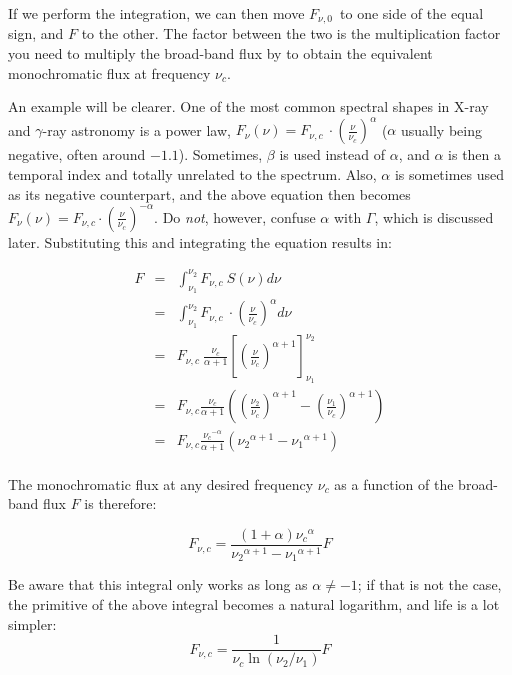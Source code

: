 \documentclass[12pt,a4paper]{article}
\newcommand{\fv}{\ensuremath{F_{\nu}}}
\newcommand{\fvz}{\ensuremath{F_{\nu, 0}}}
\newcommand{\fvc}{\ensuremath{F_{\nu, c}}}
\begin{document}
If we perform the integration, we can then move \fvz\ to one side of the equal sign, and $F$ to the other. The factor between the two is the multiplication factor you need to multiply the broad-band flux by to obtain the equivalent monochromatic flux at frequency $\nu_c$. 

An example will be clearer. One of the most common spectral shapes in X-ray and $\gamma$-ray astronomy is a power law, $\fv (\nu) = \fvc\ \cdot ({\frac{\nu}{\nu_c}})^{\alpha}$ ($\alpha$ usually being negative, often around $-1.1$). Sometimes, $\beta$ is used instead of $\alpha$, and $\alpha$ is then a temporal index and totally unrelated to the spectrum. Also, $\alpha$ is sometimes used as its negative counterpart, and the above equation then becomes $\fv (\nu) = \fvc \cdot {(\frac{\nu}{\nu_c})}^{-\alpha}$. Do \emph{not}, however, confuse $\alpha$ with $\Gamma$, which is discussed later. Substituting this and integrating the equation results in:

\begin{eqnarray*}
F & = & \int_{\nu_1}^{\nu_2} \fvc\ S (\nu) d\nu \\
& = & \int_{\nu_1}^{\nu_2} \fvc\ \cdot  {(\frac{\nu}{\nu_c})}^{\alpha} d\nu \\
& = & \fvc\ \frac{\nu_c}{\alpha+1} \left[ {(\frac{\nu}{\nu_c})}^{\alpha+1} \right]_{\nu_1}^{\nu_2} \\
& = & \fvc \frac{\nu_c}{\alpha+1} \left( {(\frac{\nu_2}{\nu_c})}^{\alpha+1} - {(\frac{\nu_1}{\nu_c})}^{\alpha+1} \right) \\
& = & \fvc \frac{{\nu_c}^{-\alpha}}{\alpha+1} \left( {\nu_2}^{\alpha+1} - {\nu_1}^{\alpha+1} \right) \\
\end{eqnarray*}

The monochromatic flux at any desired frequency $\nu_c$ as a function of the broad-band flux $F$ is therefore:

\begin{equation*}
\fvc = \frac{(1+\alpha) {\nu_c}^{\alpha}}{{\nu_2}^{\alpha+1} - {\nu_1}^{\alpha+1}} F
\end{equation*}

Be aware that this integral only works as long as $\alpha \neq -1$; if that is not the case, the primitive of the above integral becomes a natural logarithm, and life is a lot simpler: 
\begin{equation*}
\fvc = \frac{1}{\nu_c \ln (\nu_2/\nu_1)} F
\end{equation*}
\end{document}
